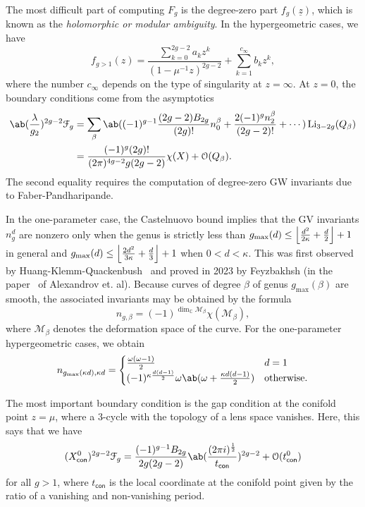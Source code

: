 \documentclass[10pt]{amsart}
\DeclarePairedDelimiter{\floor}{\lfloor}{\rfloor}
\theoremstyle{definition}
\theoremstyle{remark}
\theoremstyle{plain}
\theoremstyle{definition}
\theoremstyle{remark}
\newcommand{\C}{\mathbb{C}}
\newcommand{\M}{\mathcal{M}}
\newcommand{\mc}[1]{\mathcal{#1}}
\newcommand{\uz}{\ul{z}}
\newcommand{\on}[1]{\operatorname{#1}}
\newcommand{\ms}[1]{\mathsf{#1}}
\newcommand{\ul}[1]{\underline{#1}}
\newcommand{\1}{\mathbf{1}}
\newcommand{\2}{\mathbf{2}}
\newcommand{\3}{\mathbf{3}}
\begin{document}
The most difficult part of computing $F_g$ is the degree-zero part $f_g(\uz)$, which is known as the \textit{holomorphic or modular ambiguity}. In the hypergeometric cases, we have
\[ f_{g>1}(z) = \frac{\sum_{k=0}^{2g-2} a_k z^k}{( 1-\mu^{-1}z )^{2g-2}} + \sum_{k=1}^{c_{\infty}} b_k z^k, \]
where the number $c_{\infty}$ depends on the type of singularity at $z=\infty$. At $z=0$, the boundary conditions come from the asymptotics
\begin{align*}
    \ab(\frac{\lambda}{g_2})^{2g-2} \mc{F}_g &= \sum_{\beta} \ab((-1)^{g-1} \frac{(2g-2)B_{2g}}{(2g)!}n_0^{\beta} + \frac{2(-1)^g n_2^{\beta}}{(2g-2)!} + \cdots) \on{Li}_{3-2g}(Q_{\beta}) \\
    &= \frac{(-1)^g (2g)!}{(2\pi)^{4g-2}g(2g-2)}\chi(X) + \mc{O}(Q_{\beta}).
\end{align*}
The second equality requires the computation of degree-zero GW invariants due to Faber-Pandharipande.

In the one-parameter case, the Castelnuovo bound implies that the GV invariants $n_g^d$ are nonzero only when the genus is strictly less than $g_{\max}(d) \leq \floor*{\frac{d^2}{2\kappa}+\frac{d}{2}}+1$ in general and $g_{\max}(d) \leq \floor*{\frac{2d^2}{3\kappa} + \frac{d}{3}}+1$ when $0 < d < \kappa$. This was first observed by Huang-Klemm-Quackenbush~\cite{hkq} and proved in 2023 by Feyzbakhsh (in the paper~\cite{qgeommod} of Alexandrov et. al). Because curves of degree $\beta$ of genus $g_{\max}(\beta)$ are smooth, the associated invariants may be obtained by the formula
\[ n_{g,\beta} = (-1)^{\dim_{\C} \M_{\beta}} \chi(\M_{\beta}), \]
where $\M_{\beta}$ denotes the deformation space of the curve. For the one-parameter hypergeometric cases, we obtain
\[ n_{g_{\max}(\kappa d),\kappa d} = \begin{cases}
    \frac{\omega(\omega-1)}{2} & d=1 \\
    (-1)^{\kappa \frac{d(d-1)}{2}} \omega \ab(\omega + \frac{\kappa d(d-1)}{2}) & \text{otherwise}.
\end{cases}
\]

The most important boundary condition is the gap condition at the conifold point $z=\mu$, where a $3$-cycle with the topology of a lens space vanishes. Here, this says that we have
\[ (X^0_{\ms{con}})^{2g-2}\mc{F}_g = \frac{(-1)^{g-1}B_{2g}}{2g(2g-2)} \ab(\frac{(2\pi i)^{\frac{1}{2}}}{t_{\ms{con}}})^{2g-2} + \mc{O}(t_{\ms{con}}^0) \]
for all $g > 1$, where $t_{\ms{con}}$ is the local coordinate at the conifold point given by the ratio of a vanishing and non-vanishing period.
\end{document}
